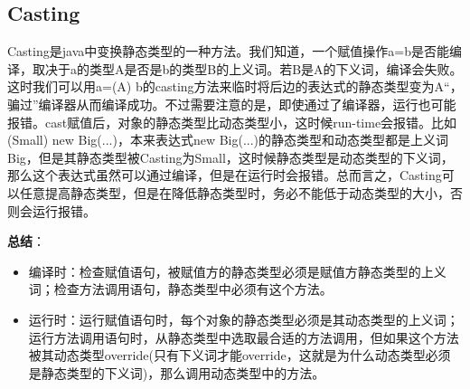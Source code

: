 \documentclass{article}
\begin{document}
	\subsection{Casting}
	Casting是java中变换静态类型的一种方法。我们知道，一个赋值操作a=b是否能编译，取决于a的类型A是否是b的类型B的上义词。若B是A的下义词，编译会失败。这时我们可以用a=(A) b的casting方法来临时将后边的表达式的静态类型变为A“，骗过”编译器从而编译成功。不过需要注意的是，即使通过了编译器，运行也可能报错。cast赋值后，对象的静态类型比动态类型小，这时候run-time会报错。比如(Small) new Big(...)，本来表达式new Big(...)的静态类型和动态类型都是上义词Big，但是其静态类型被Casting为Small，这时候静态类型是动态类型的下义词，那么这个表达式虽然可以通过编译，但是在运行时会报错。总而言之，Casting可以任意提高静态类型，但是在降低静态类型时，务必不能低于动态类型的大小，否则会运行报错。
	
	{\bfseries 总结}：
	\begin{itemize}
		\item 编译时：检查赋值语句，被赋值方的静态类型必须是赋值方静态类型的上义词；检查方法调用语句，静态类型中必须有这个方法。
		\item 运行时：运行赋值语句时，每个对象的静态类型必须是其动态类型的上义词；运行方法调用语句时，从静态类型中选取最合适的方法调用，但如果这个方法被其动态类型override(只有下义词才能override，这就是为什么动态类型必须是静态类型的下义词)，那么调用动态类型中的方法。
	\end{itemize}
	
\end{document}
